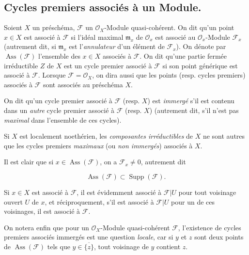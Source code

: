 \subsection{Cycles premiers associés à un Module.}

\begin{definition}[3.1.1]
\label{IV.2.3.1.1-def-fr}
Soient $X$ un préschéma, $\mathcal F$ un $\mathcal O_X$-Module
quasi-cohérent. On dit qu'un point $x\in X$ est associé à $\mathcal F$ si
l'idéal maximal $\mathfrak m_x$ de $\mathcal O_x$ est associé au
$\mathcal O_x$-Module $\mathcal F_x$ \textup{(autrement dit, si $\mathfrak m_x$ est
l'\emph{annulateur} d'un élément de $\mathcal F_x$)}. On dénote par
$\operatorname{Ass}(\mathcal F)$ l'ensemble des $x\in X$ associés à
$\mathcal F$. On dit qu'une partie fermée irréductible $Z$ de $X$ est un
cycle premier associé à $\mathcal F$ si son point générique est
associé à $\mathcal F$. Lorsque $\mathcal F=\mathcal O_X$, on dira aussi que
les points \textup{(resp.} cycles premiers) associés à $\mathcal F$ sont
associés au préschéma $X$.
\end{definition}

On dit qu'un cycle premier associé à $\mathcal F$ (resp. $X$) est
\emph{immergé} s'il est contenu dans un \emph{autre} cycle premier associé à
$\mathcal F$ (resp. $X$) (autrement dit, s'il n'est pas \emph{maximal} dans
l'ensemble de ces cycles).

Si $X$ est localement noethérien, les \emph{composantes irréductibles} de $X$
ne sont autres que les cycles premiers \emph{maximaux} (ou \emph{non immergés})
associés à $X$.

Il est clair que si $x\in\operatorname{Ass}(\mathcal F)$, on a
$\mathcal F_x\ne0$, autrement dit

\begin{env}[3.1.1.1]
\label{IV.2.3.1.1.1-fr}
\[
\operatorname{Ass}(\mathcal F)\subset\operatorname{Supp}(\mathcal F).
\]
\end{env}

Si $x\in X$ est associé à $\mathcal F$, il est évidemment associé à
$\mathcal F|U$ pour tout voisinage ouvert $U$ de $x$, et réciproquement, s'il
est associé à $\mathcal F|U$ pour un de ces voisinages, il est associé à
$\mathcal F$.

On notera enfin que pour un $\mathcal O_X$-Module quasi-cohérent $\mathcal F$,
l'existence de cycles premiers associés immergés est une question \emph{locale},
car si $y$ et $z$ sont deux points de $\operatorname{Ass}(\mathcal F)$ tels
que $y\in\overline{\{z\}}$, tout voisinage de $y$ contient $z$.

